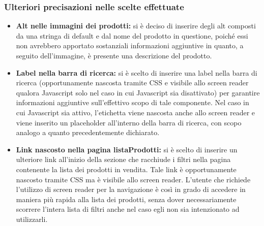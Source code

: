  \subsubsection{Ulteriori precisazioni nelle scelte effettuate}
 \begin{itemize}
     \item \textbf{Alt nelle immagini dei prodotti:} si è deciso di inserire degli alt composti da una stringa di default e dal nome del prodotto in questione, poiché essi non avrebbero apportato sostanziali informazioni aggiuntive in quanto, a seguito dell'immagine, è presente una descrizione del prodotto.
     \item \textbf{Label nella barra di ricerca:} si è scelto di inserire una label nella barra di ricerca (opportunamente nascosta tramite CSS e visibile allo screen reader qualora Javascript solo nel caso in cui Javascript sia disattivato) per garantire informazioni aggiuntive sull'effettivo scopo di tale componente. Nel caso in cui Javascript sia attivo, l'etichetta viene nascosta anche allo screen reader e viene inserito un placeholder all'interno della barra di ricerca, con scopo analogo a quanto precedentemente dichiarato.  
     \item \textbf{Link nascosto nella pagina listaProdotti:} si è scelto di inserire un ulteriore link all'inizio della sezione che racchiude i filtri nella pagina contenente la lista dei prodotti in vendita. Tale link è opportunamente nascosto tramite CSS ma è visibile allo screen reader. L'utente che richiede l'utilizzo di screen reader per la navigazione è così in grado di accedere in maniera più rapida alla lista dei prodotti, senza dover necessariamente scorrere l'intera lista di filtri anche nel caso egli non sia intenzionato ad utilizzarli.
 \end{itemize}

